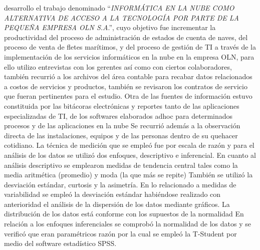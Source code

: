 \cite{jcampos} desarrollo el trabajo denominado ``\emph{INFORM\'ATICA EN LA NUBE
COMO ALTERNATIVA DE ACCESO A LA TECNOLOG\'IA POR PARTE DE LA PEQUE\~NA EMPRESA
OLN S.A}.'', cuyo objetivo fue incrementar la productividad del proceso de
administraci\'on de estados de cuenta de naves, del proceso de venta de fletes
mar\'itimos, y del proceso de gesti\'on de TI a trav\'es de la implementaci\'on
de los servicios inform\'aticos en la nube en la empresa OLN, para ello utilizo
entrevistas con los gerentes as\'i como con ciertos colaboradores, tambi\'en recurri\'o
a los archivos del \'area contable para recabar datos relacionados a costos de
servicios y productos, tambi\'en se revisaron los contratos de servicio que fueran
pertinentes para el estudio. Otra de las fuentes de informaci\'on estuvo constituida
por las bit\'acoras electr\'onicas y reportes tanto de las aplicaciones especializadas de
TI, de los softwares elaborados adhoc para determinados procesos y de las aplicaciones en la nube
Se recurri\'o adem\'as a la observaci\'on directa de las instalaciones, equipos y de las personas
dentro de su quehacer cotidiano. La t\'ecnica de medici\'on que se emple\'o fue por escala de
raz\'on y para el an\'alisis de los datos se utiliz\'o dos enfoques, descriptivo e inferencial.
En cuanto al an\'alisis descriptivo se emplearon medidas de tendencia central tales como
la media aritm\'etica (promedio) y moda (la que m\'as se repite) Tambi\'en se utiliz\'o la
desviaci\'on est\'andar, curtosis y la asimetr\'ia.
En lo relacionado a medidas de variabilidad se emple\'o la desviaci\'on est\'andar habi\'endose
realizado con anterioridad el an\'alisis de la dispersi\'on de los datos mediante gr\'aficos.
La distribuci\'on de los datos est\'a conforme con los supuestos de la normalidad
En relaci\'on a los enfoques inferenciales se comprob\'o la normalidad de los datos y se
verific\'o que eran param\'etricos raz\'on por la cual se emple\'o la T-Student por medio del
software estad\'istico SPSS.

